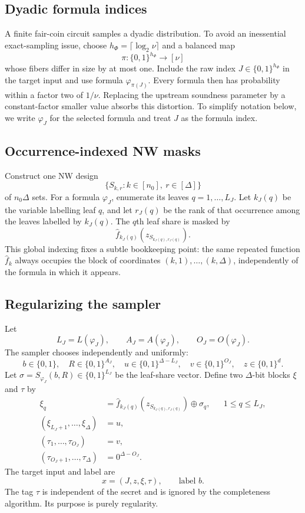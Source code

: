 \documentclass[11pt]{article}
\theoremstyle{definition}
\newcommand{\bits}{\{0,1\}}
\newcommand{\xor}{\mathbin{\oplus}}
\begin{document}
\subsection{Dyadic formula indices}

A finite fair-coin circuit samples a dyadic distribution.  To avoid an inessential exact-sampling issue, choose
$h_\Phi=\lceil\log_2\nu\rceil$ and a balanced map
\[
 \pi:\bits^{h_\Phi}\to[\nu]
\]
whose fibers differ in size by at most one.  Include the raw index $J\in\bits^{h_\Phi}$ in the target input and use formula $\varphi_{\pi(J)}$.  Every formula then has probability within a factor two of $1/\nu$.  Replacing the upstream soundness parameter by a constant-factor smaller value absorbs this distortion.  To simplify notation below, we write $\varphi_J$ for the selected formula and treat $J$ as the formula index.

\subsection{Occurrence-indexed NW masks}

Construct one NW design
\[
 \{S_{k,r}:k\in[n_0],\ r\in[\Delta]\}
\]
of $n_0\Delta$ sets.  For a formula $\varphi_J$, enumerate its leaves
$q=1,\ldots,L_J$.  Let $k_J(q)$ be the variable labelling leaf $q$, and let $r_J(q)$ be the rank of that occurrence among the leaves labelled by $k_J(q)$.  The $q$th leaf share is masked by
\[
 \widehat f_{k_J(q)}(z_{S_{k_J(q),r_J(q)}}).
\]
This global indexing fixes a subtle bookkeeping point: the same repeated function $\widehat f_k$ always occupies the block of coordinates $(k,1),\ldots,(k,\Delta)$, independently of the formula in which it appears.

\subsection{Regularizing the sampler}

Let
\[
 L_J=L(\varphi_J),\qquad A_J=A(\varphi_J),\qquad O_J=O(\varphi_J).
\]
The sampler chooses independently and uniformly:
\[
 b\in\bits,
 \quad R\in\bits^{A_J},
 \quad u\in\bits^{\Delta-L_J},
 \quad v\in\bits^{O_J},
 \quad z\in\bits^d.
\]
Let $\sigma=S_{\varphi_J}(b,R)\in\bits^{L_J}$ be the leaf-share vector.  Define two $\Delta$-bit blocks $\xi$ and $\tau$ by
\begin{align*}
 \xi_q&=
 \widehat f_{k_J(q)}(z_{S_{k_J(q),r_J(q)}})\xor\sigma_q,
 &&1\le q\le L_J,\\
 (\xi_{L_J+1},\ldots,\xi_\Delta)&=u,\\
 (\tau_1,\ldots,\tau_{O_J})&=v,\\
 (\tau_{O_J+1},\ldots,\tau_\Delta)&=0^{\Delta-O_J}.
\end{align*}
The target input and label are
\begin{equation}\label{eq:sparse-sample}
 x=(J,z,\xi,\tau),
 \qquad\text{label }b.
\end{equation}
The tag $\tau$ is independent of the secret and is ignored by the completeness algorithm.  Its purpose is purely regularity.
\end{document}
